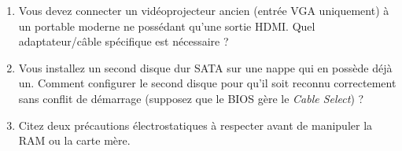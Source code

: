 \documentclass[11pt]{article}
\begin{document}
\begin{exercice}
\begin{enumerate}
    \item Vous devez connecter un vidéoprojecteur ancien (entrée VGA uniquement) à un portable moderne ne possédant qu'une sortie HDMI. Quel adaptateur/câble spécifique est nécessaire ?
    \item Vous installez un second disque dur SATA sur une nappe qui en possède déjà un. Comment configurer le second disque pour qu'il soit reconnu correctement sans conflit de démarrage (supposez que le BIOS gère le \textit{Cable Select}) ?
    \item Citez deux précautions électrostatiques à respecter avant de manipuler la RAM ou la carte mère.
\end{enumerate}
\end{exercice}
\end{document}
